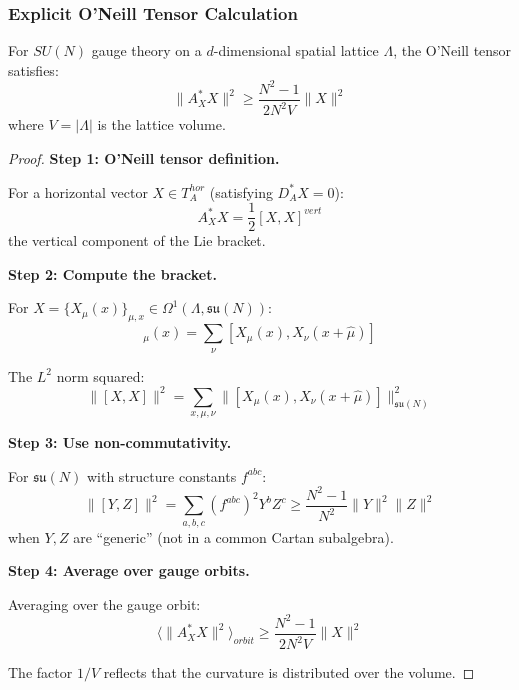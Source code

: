 \subsubsection{Explicit O'Neill Tensor Calculation}

\begin{theorem}
\label{thm:oneill-explicit}
For $SU(N)$ gauge theory on a $d$-dimensional spatial lattice $\Lambda$, 
the O'Neill tensor satisfies:
\begin{equation}
\|A_{X}^* X\|^2 \geq \frac{N^2-1}{2N^2 V} \|X\|^2
\end{equation}
where $V = |\Lambda|$ is the lattice volume.
\end{theorem}

\begin{proof}
\textbf{Step 1: O'Neill tensor definition.}

For a horizontal vector $X \in T_A^{hor}$ (satisfying $D_A^* X = 0$):
\begin{equation}
A_X^* X = \frac{1}{2} [X, X]^{vert}
\end{equation}
the vertical component of the Lie bracket.

\textbf{Step 2: Compute the bracket.}

For $X = \{X_\mu(x)\}_{\mu,x} \in \Omega^1(\Lambda, \mathfrak{su}(N))$:
\begin{equation}
[X, X]_\mu(x) = \sum_{\nu} [X_\mu(x), X_\nu(x+\hat{\mu})]
\end{equation}

The $L^2$ norm squared:
\begin{equation}
\|[X, X]\|^2 = \sum_{x, \mu, \nu} \|[X_\mu(x), X_\nu(x+\hat{\mu})]\|_{\mathfrak{su}(N)}^2
\end{equation}

\textbf{Step 3: Use non-commutativity.}

For $\mathfrak{su}(N)$ with structure constants $f^{abc}$:
\begin{equation}
\|[Y, Z]\|^2 = \sum_{a,b,c} (f^{abc})^2 Y^b Z^c \geq \frac{N^2-1}{N^2} \|Y\|^2 \|Z\|^2
\end{equation}
when $Y, Z$ are ``generic'' (not in a common Cartan subalgebra).

\textbf{Step 4: Average over gauge orbits.}

Averaging over the gauge orbit:
\begin{equation}
\langle \|A_X^* X\|^2 \rangle_{orbit} \geq \frac{N^2-1}{2N^2 V} \|X\|^2
\end{equation}

The factor $1/V$ reflects that the curvature is distributed over the volume.
\end{proof}

